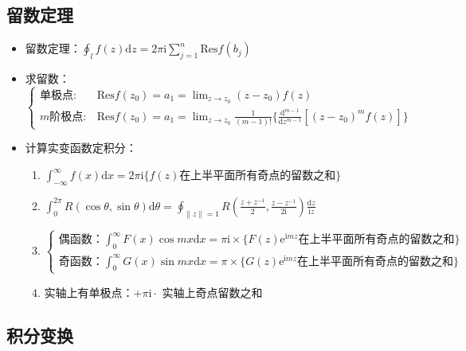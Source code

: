 \documentclass{article}
\begin{document}
\subsection{留数定理}

\begin{itemize}
    \item 留数定理：$\oint_lf(z)\mathrm{d}z=2\pi\mathrm{i}\sum^n_{j=1}\mathrm{Res}f(b_j)$
    \item 求留数：$\begin{cases}\text{单极点}:&\mathrm{Res}f(z_0)=a_1=\lim_{z\to z_0}(z-z_0)f(z)\\ m \text{阶极点}:&\mathrm{Res}f(z_0)=a_1=\lim_{z\to z_0}\frac{1}{(m-1)!}\{\frac{\mathrm{d}^{m-1}}{\mathrm{d}z^{m-1}}[(z-z_0)^mf(z)]\}\end{cases}$
    \item 计算实变函数定积分：\begin{enumerate}
              \item $\int^{\infty}_{-\infty}f(x)\mathrm{d}x=2\pi\mathrm{i}\{f(z) \text{在上半平面所有奇点的留数之和}\}$
              \item $\int^{2\pi}_0R(\cos\theta,\sin\theta)\mathrm{d}\theta=\oint_{\|z\|=1}R(\frac{z+z^{-1}}{2}, \frac{z-z^{-1}}{2\mathrm{i}})\frac{\mathrm{d}z}{\mathrm{i}z}$
              \item $\begin{cases}偶函数：\int^\infty_0F(x)\cos mx\mathrm{d}x=\pi\mathrm{i} \times \{F(z)\mathrm{e}^{\mathrm{i}mz}\text{在上半平面所有奇点的留数之和}\}\\ 奇函数：\int^\infty_0G(x)\sin mx\mathrm{d}x=\pi \times \{G(z)\mathrm{e}^{\mathrm{i}mz}\text{在上半平面所有奇点的留数之和}\}\end{cases}$
              \item 实轴上有单极点：$+\pi\mathrm{i}\cdot$ 实轴上奇点留数之和
          \end{enumerate}
\end{itemize}

\subsection{积分变换}
\end{document}
